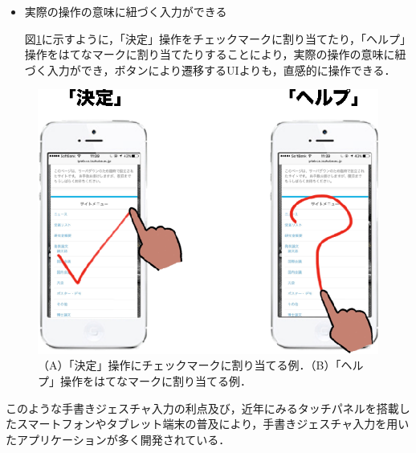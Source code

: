 \begin{itemize}
 \item 実際の操作の意味に紐づく入力ができる
 
 図\ref{fig:semantic}に示すように，「決定」操作をチェックマークに割り当てたり，「ヘルプ」操作をはてなマークに割り当てたりすることにより，実際の操作の意味に紐づく入力ができ，ボタンにより遷移するUIよりも，直感的に操作できる．
\end{itemize}

\begin{figure} [htbp]
\centering
\includegraphics [width=0.5\columnwidth]{img/semantic.eps}
\caption{（A）「決定」操作にチェックマークに割り当てる例．（B）「ヘルプ」操作をはてなマークに割り当てる例．}
\label{fig:semantic}
\end{figure}

このような手書きジェスチャ入力の利点及び，近年にみるタッチパネルを搭載したスマートフォンやタブレット端末の普及により，手書きジェスチャ入力を用いたアプリケーションが多く開発されている．

